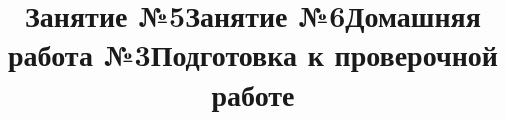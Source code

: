 \begin{listofex}
	\item {}
	\item {}
	\item {}
	\item {}
	\item {}
	\item {}
	\item {}
\end{listofex}
\newpage
\title{Занятие №5}
\begin{listofex}
	\item {}
	\item {}
	\item {}
	\item {}
	\item {}
	\item {}
	\item {}
	\item {}
\end{listofex}
\newpage
\title{Занятие №6}
\begin{listofex}
	\item {}
	\item {}
	\item {}
	\item {}
	\item {}
	\item {}
	\item {}
	\item {}
\end{listofex}
\newpage
\title{Домашняя работа №3}
\begin{listofex}
	\item {}
	\item {}
	\item {}
	\item {}
	\item {}
	\item {}
	\item {}
\end{listofex}
\newpage
\title{Подготовка к проверочной работе}
